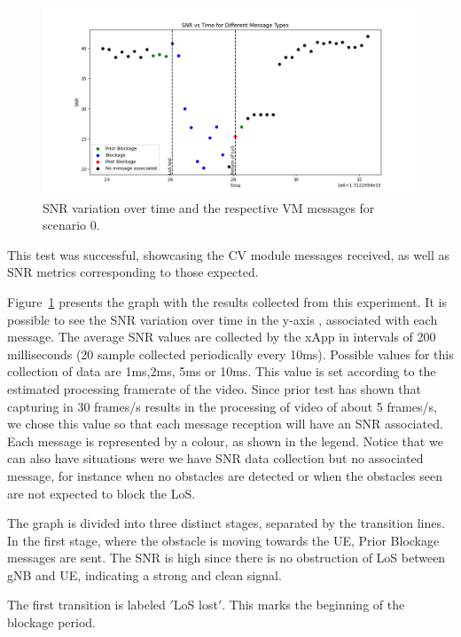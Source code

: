 \begin{figure}[H]
    \centering
    \includegraphics[width=\linewidth]{figures/results_0}
    \caption{SNR variation over time and the respective VM messages for scenario 0.}
    \label{fig:results_0}
\end{figure}


This test was successful, showcasing the CV module messages received, as well as SNR metrics corresponding to those expected.

Figure~\ref{fig:results_0} presents the graph with the results collected from this experiment.
It is possible to see the SNR variation over time in the y-axis , associated with each message.
The average SNR values are collected by the xApp in intervals of 200 milliseconds (20 sample collected periodically every 10ms).
Possible values for this collection of data are 1ms,2ms, 5ms or 10ms.
This value is set according to the estimated processing framerate of the video.
Since prior test has shown that capturing in 30 frames/s results in the processing of video of about 5 frames/s, we chose this value so that each message reception will have an SNR associated.
Each message is represented by a colour, as shown in the legend.
Notice that we can also have situations were we have SNR data collection but no associated message, for instance when no obstacles are detected or when the obstacles seen are not expected to block the LoS\@.

The graph is divided into three distinct stages, separated by the transition lines.
In the first stage, where the obstacle is moving towards the UE, Prior Blockage messages are sent.
The SNR is high  since there is no obstruction of LoS between gNB and UE, indicating a strong and clean signal.

The first transition is labeled \('\)LoS lost\('\).
This marks the beginning of the blockage period.

